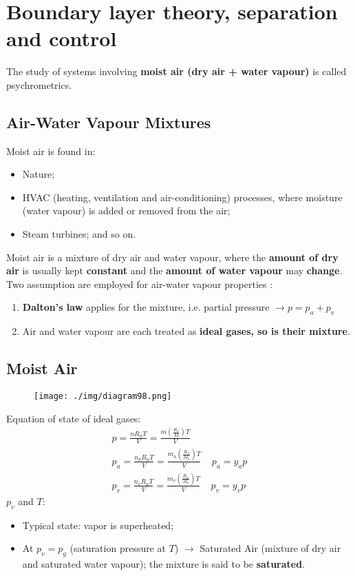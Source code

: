 \chapter{Boundary layer theory, separation and control}
The study of systems involving \textbf{moist air (dry air + water vapour)} is called psychrometrics.
\section{Air-Water Vapour Mixtures}
Moist air is found in:
\begin{itemize}[noitemsep]
  \item Nature;
  \item HVAC (heating, ventilation and air-conditioning) processes, where moisture (water vapour) is added or removed from the air;
  \item Steam turbines; and so on.
\end{itemize}
Moist air is a mixture of dry air and water vapour, where the \textbf{amount of dry air} is usually kept \textbf{constant} and the \textbf{amount of water vapour} may \textbf{change}. Two assumption are employed for air-water vapour properties :
\begin{enumerate}[noitemsep]
  \item \textbf{Dalton’s law} applies for the mixture, i.e. partial pressure $\longrightarrow p = p_a + p_v$
  \item Air and water vapour are each treated as \textbf{ideal gases, so is their mixture}.
\end{enumerate}
\section{Moist Air}
\begin{figure}[H]
  \centering
  \texttt{[image: ./img/diagram98.png]}
  \caption{}
\end{figure}
Equation of state of ideal gases:
\begin{gather}
  p = \frac{n R_u T}{V} = \frac{m(\frac{R_u}{M})T}{V} \\[5pt]
  p_a = \frac{n_a R_u T}{V} = \frac{m_a(\frac{R_u}{M_a})T}{V} \ \ \ \ \ p_a = y_ap\\[5pt]
  p_v = \frac{n_v R_u T}{V} = \frac{m_v(\frac{R_u}{M_v})T}{V} \ \ \ \ \ p_v = y_vp
\end{gather}
$p_v$ and $T$:
\begin{itemize}[noitemsep]
  \item Typical state: vapor is superheated;
  \item At $p_v = p_g$ (saturation pressure at $T$) $\longrightarrow$ Saturated Air (mixture of dry air and saturated water vapour); the mixture is said to be \textbf{saturated}.
\end{itemize}
